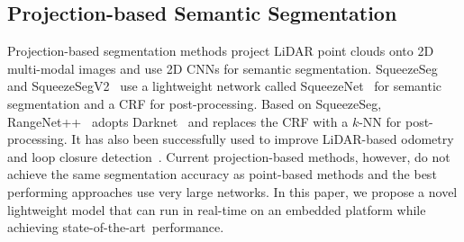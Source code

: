 \documentclass[letterpaper, 10 pt, journal, twoside]{ieeetran}
\def\sArt{{state-of-the-art~}}
\begin{document}
\subsection{Projection-based Semantic Segmentation}\label{sec:relwork_proj}
Projection-based segmentation methods project LiDAR point clouds onto 2D multi-modal images and use 2D CNNs for semantic segmentation. SqueezeSeg~\cite{wu2018squeezeseg} and 
SqueezeSegV2~\cite{wu2019squeezesegv2} 
use a lightweight network called SqueezeNet~\cite{iandola2016squeezenet}
for semantic segmentation and a CRF for post-processing.
Based on SqueezeSeg,  RangeNet++~\cite{milioto2019rangenet++} adopts Darknet~\cite{redmon2018yolov3} and replaces the CRF with a $k$-NN for post-processing.
It has also been successfully used to improve LiDAR-based odometry~\cite{chen2019suma++} and loop closure detection~\cite{chen2020overlapnet}.
Current projection-based methods, however, do not achieve the same segmentation accuracy as point-based methods and the best performing approaches use very large networks. In this paper, we propose a novel lightweight model that can run in real-time on an embedded platform while achieving \sArt performance.
\end{document}
